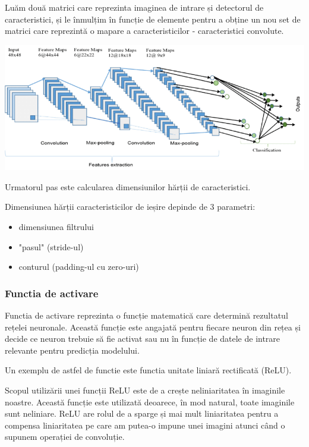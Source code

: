 \documentclass[10pt]{article}
\begin{document}
\> Luăm două matrici care reprezinta imaginea de intrare și detectorul de caracteristici, și le înmulțim în funcție de elemente pentru a obține un nou set de matrici care reprezintă o mapare a caracteristicilor - caracteristici convolute.


\begin{center}

  \includegraphics[scale=0.4]{convolutie}
  
\end{center}

\> Urmatorul pas este calcularea dimensiunilor hărții de caracteristici.

\> Dimensiunea hărții caracteristicilor de ieșire depinde de 3 parametri:

\begin{itemize}
\item dimensiunea filtrului
\item "pasul" (stride-ul)
\item conturul (padding-ul cu zero-uri)
\end{itemize}

\newpage

\subsubsection{Functia de activare}

\> Functia de activare reprezinta o funcție matematică care determină rezultatul rețelei neuronale.
Această funcție este angajată pentru fiecare neuron din rețea și decide ce neuron trebuie să fie activat sau nu în funcție de datele de intrare relevante pentru predicția modelului.

\> Un exemplu de astfel de functie este functia unitate liniară rectificată (ReLU).

\> Scopul utilizării unei funcții ReLU este de a crește neliniaritatea în imaginile noastre.
Această funcție este utilizată deoarece, în mod natural, toate imaginile sunt neliniare.
ReLU are rolul de a sparge și mai mult liniaritatea pentru a compensa liniaritatea pe care am putea-o impune unei imagini atunci când o supunem operației de convoluție.
\end{document}

